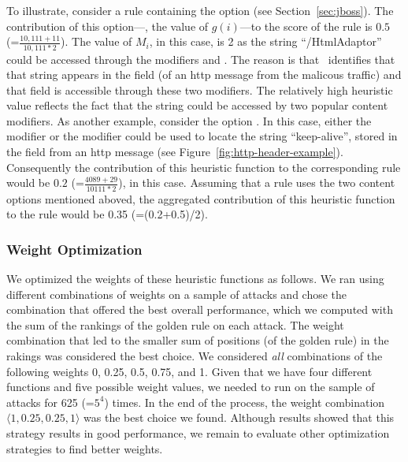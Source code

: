 \documentclass[sigconf,review, anonymous]{acmart}
\begin{document}
To illustrate, consider a rule containing the option
 (see Section~\ref{sec:jboss}). The
contribution of this option---\ie{}, the value of $\mathit{g(i)}$---to
the score of the rule is $0.5$ (=$\frac{10,111+11}{10,111*2}$). The
value of $M_i$, in this case, is 2 as the string ``/HtmlAdaptor''
could be accessed through the modifiers  and
. The reason is that \tname\ identifies that
that string appears in the field  (of an http
message from the malicous traffic) and that field is accessible
through these two modifiers. The relatively high heuristic value
reflects the fact that the string could be accessed by two popular
content modifiers.  As another example, consider the option
. In this case, either the modifier
 or the modifier  could be used to
locate the string ``keep-alive'', stored in the field
 from an http message (see
Figure~\ref{fig:http-header-example}). Consequently the contribution
of this heuristic function to the corresponding rule would be $0.2$
(=$\frac{4089+29}{10111*2}$), in this case. Assuming that a rule uses
the two content options mentioned aboved, the aggregated contribution
of this heuristic function to the rule would be 0.35 (=(0.2+0.5)/2).

\subsubsection{Weight Optimization}
\label{sec:weight-optimization}
We optimized the weights of these heuristic functions as follows. We
ran \tname{} using different combinations of weights on a sample of
attacks and chose the combination that offered the best overall
performance, which we computed with the sum of the rankings of the
golden rule on each attack. The weight combination that led to the
smaller sum of positions (of the golden rule) in the rakings was
considered the best choice. We considered \emph{all} combinations of
the following weights 0, 0.25, 0.5, 0.75, and 1. Given that we have
four different functions and five possible weight values, we needed to
run \tname{} on the sample of attacks for 625 (=$5^4$) times. In the
end of the process, the weight combination
$\langle{}1,0.25,0.25,1\rangle$ was the best choice we found. Although
results showed that this strategy results in good performance, we
remain to evaluate other optimization strategies to find better
weights.

 
\end{document}
